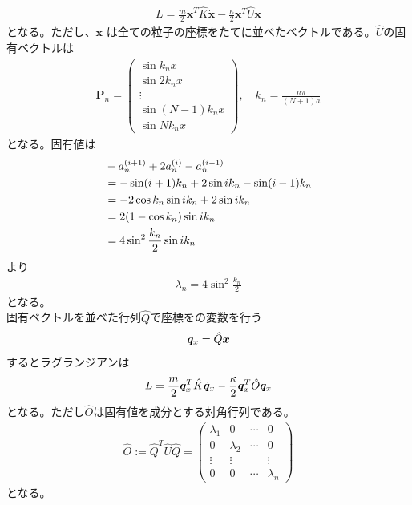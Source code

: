 \documentclass[dvipdfmx, 11pt, a4paper]{jsarticle}
\theoremstyle{definition}
\begin{document}
    \begin{align}
        L = \frac{m}{2} \dot{\bm{x}}^T \hat{K} \dot{\bm{x}} - \frac{\kappa}{2} \bm{x}^T \hat{U} \bm{x} 
    \end{align}
    となる。ただし、$\bm{x}$ は全ての粒子の座標をたてに並べたベクトルである。$\hat{U}$の固有ベクトルは
    \begin{align}
        \bm{P}_n = \left(
        \begin{matrix}
            \sin k_nx\\
            \sin 2k_nx\\
            \vdots \\
            \sin (N-1)k_nx\\
            \sin N k_nx
        \end{matrix}
        \right),\quad k_n = \frac{n \pi}{(N+1)a}
    \end{align}
    となる。固有値は
    \begin{align}
        &-a_n^{(i+1)}+2a_n^{(i)} - a_n^{(i-1)} \notag  \\
        &= -\sin (i+1) k_n +2 \sin i k_n - \sin (i-1) k_n \notag \\
        &= -2\cos k_n \sin i k_n + 2 \sin i k_n \notag \\
        &= 2 (1-\cos k_n)\sin i k_n \notag \\
        &= 4 \sin^2 \frac{k_n}{2}\sin i k_n \notag 
    \end{align}
    より
    \begin{align}
        \lambda_n = 4 \sin^2 \frac{k_n}{2} 
    \end{align}
    となる。\\
    固有ベクトルを並べた行列$\hat{Q}$で座標をの変数を行う
    \begin{align}
        \bm{q}_{x} = \hat{Q} \bm{x} \notag 
    \end{align}
    するとラグランジアンは
    \begin{align}
        L = \frac{m}{2} \dot{\bm{q}}_x^T \hat{K} \dot{\bm{q}}_x  - \frac{\kappa}{2} \bm{q}_x^T \hat{O} \bm{q}_x \notag 
    \end{align}
    となる。ただし$\hat{O}$は固有値を成分とする対角行列である。
    \begin{align}
        \hat{O} := \hat{Q}^T \hat{U} \hat{Q} = \left( 
        \begin{matrix}
            \lambda_1&0&\cdots&0\\
            0&\lambda_2&\cdots&0 \\
            \vdots &\vdots &&\vdots \\
            0&0&\cdots&\lambda_n
        \end{matrix}
        \right)
    \end{align}
    となる。
\end{document}
